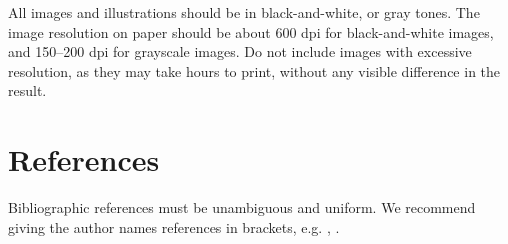 \documentclass[12pt]{article}
\begin{document}
All images and illustrations should be in black-and-white, or gray
tones. The image resolution on paper should be about 600 dpi for
black-and-white images, and 150--200 dpi for grayscale images. Do not
include images with excessive resolution, as they may take hours to
print, without any visible difference in the result.

\section{References}

Bibliographic references must be unambiguous and uniform. We recommend
giving the author names references in brackets, e.g. \cite{knuth:89}, \cite{smith:99}.



\end{document}
